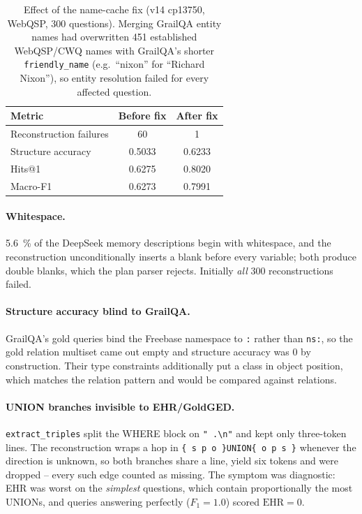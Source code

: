 \documentclass[11pt,a4paper]{article}
\begin{document}
\begin{table}[htbp]
  \centering
  \caption{Effect of the name-cache fix (v14 cp13750, WebQSP, \num{300}
  questions). Merging GrailQA entity names had overwritten \num{451} established
  WebQSP/CWQ names with GrailQA's shorter \texttt{friendly\_name} (e.g.\
  ``nixon'' for ``Richard Nixon''), so entity resolution failed for every
  affected question.}
  \label{tab:bugfix}
  \small
  \begin{tabular}{lS[table-format=2.4]S[table-format=2.4]}
    \toprule
    Metric & {Before fix} & {After fix} \\
    \midrule
    Reconstruction failures & 60 & 1 \\
    Structure accuracy      & 0.5033 & 0.6233 \\
    Hits@1                  & 0.6275 & 0.8020 \\
    Macro-F1                & 0.6273 & 0.7991 \\
    \bottomrule
  \end{tabular}
\end{table}

\paragraph{Whitespace.}
\SI{5.6}{\percent} of the DeepSeek memory descriptions begin with whitespace,
and the reconstruction unconditionally inserts a blank before every variable;
both produce double blanks, which the plan parser rejects. Initially
\emph{all} \num{300} reconstructions failed.

\paragraph{Structure accuracy blind to GrailQA.}
GrailQA's gold queries bind the Freebase namespace to \texttt{:} rather than
\texttt{ns:}, so the gold relation multiset came out empty and structure
accuracy was \num{0} by construction. Their type constraints additionally put a
class in object position, which matches the relation pattern and would be
compared against relations.

\paragraph{UNION branches invisible to EHR/GoldGED.}
\texttt{extract\_triples} split the WHERE block on \verb!" .\n"! and kept only
three-token lines. The reconstruction wraps a hop in
\verb!{ s p o }UNION{ o p s }! whenever the direction is unknown, so both
branches share a line, yield six tokens and were dropped -- every such edge
counted as missing. The symptom was diagnostic: EHR was worst on the
\emph{simplest} questions, which contain proportionally the most UNIONs, and
queries answering perfectly (\(F_1 = 1.0\)) scored \(\text{EHR} = 0\).
\end{document}
